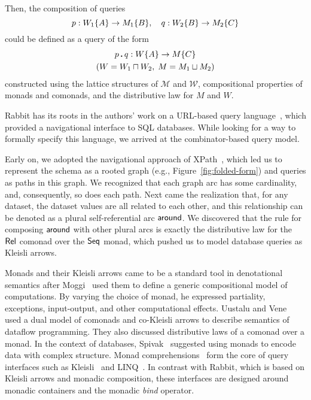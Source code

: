 Then, the composition of queries
\begin{equation*}
    p : W_1{\left\{A\right\}} \to M_1{\left\{B\right\}}, \quad q : W_2{\left\{B\right\}} \to M_2{\left\{C\right\}}
\end{equation*}
could be defined as a query of the form
\begin{multline*}
    p\,\boldsymbol{.}\,q : W{\left\{A\right\}} \to M{\left\{C\right\}} \\ (W = W_1 \sqcap W_2,\; M = M_1 \sqcup M_2)
\end{multline*}
constructed using the lattice structures of $\mathcal{M}$ and $\mathcal{W}$,
compositional properties of monads and comonads, and the distributive law for
$M$ and $W$.

Rabbit has its roots in the authors' work on a URL-based query
language~\cite{Evans2007}, which provided a navigational interface to SQL
databases.  While looking for a way to formally specify this language, we
arrived at the combinator-based query model.

Early on, we adopted the navigational approach of XPath~\cite{Clark1999}, which
led us to represent the schema as a rooted graph (e.g.,
Figure~\ref{fig:folded-form}) and queries as paths in this graph.  We
recognized that each graph arc has some cardinality, and, consequently, so does
each path.  Next came the realization that, for any dataset, the dataset values
are all related to each other, and this relationship can be denoted as a plural
self-referential arc $\mathsf{around}$.  We discovered that the rule for composing
$\mathsf{around}$ with other plural arcs is exactly the distributive law for the
$\mathsf{Rel}$ comonad over the $\mathsf{Seq}$ monad, which pushed us to model
database queries as Kleisli arrows.

Monads and their Kleisli arrows came to be a standard tool in denotational
semantics after Moggi~\cite{Moggi1991} used them to define a generic
compositional model of computations.  By varying the choice of monad, he
expressed partiality, exceptions, input-output, and other computational
effects.  Uustalu and Vene~\cite{Uustalu2005} used a dual model of comonads and
co-Kleisli arrows to describe semantics of dataflow programming.  They also
discussed distributive laws of a comonad over a monad.  In the context of
databases, Spivak~\cite{Spivak2012} suggested using monads to encode data with
complex structure.  Monad comprehensions~\cite{Trinder1989, Buneman1994} form
the core of query interfaces such as Kleisli~\cite{Wong2000} and
LINQ~\cite{Meijer2006}.  In contrast with Rabbit, which is based on Kleisli
arrows and monadic composition, these interfaces are designed around monadic
containers and the monadic \emph{bind} operator.

